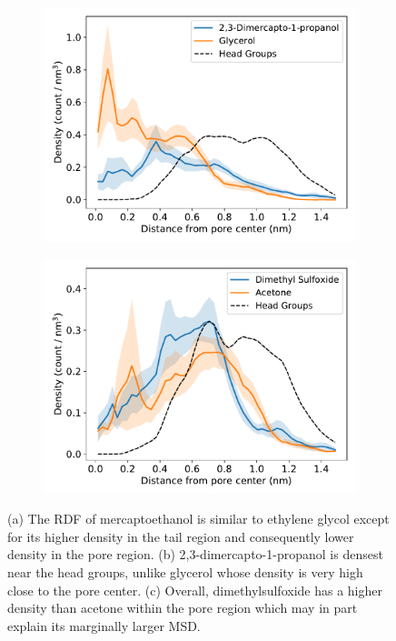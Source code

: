 \documentclass[journal=jpcbfk,manuscript=article]{achemso}
\begin{document}
\begin{figure}[!htb]
\begin{subfigure}{0.45\linewidth}
  \includegraphics[width=\textwidth]{thiol_comparison_DMP.pdf}
  \caption{}\label{fig:DMP_GLY_comparison}
  \end{subfigure}
  \begin{subfigure}{0.45\linewidth}
  \includegraphics[width=\textwidth]{thiol_comparison_DMS.pdf}
  \caption{}\label{fig:DMS_ATO_comparison}
  \end{subfigure}
  \caption{(a) The RDF of mercaptoethanol is similar to ethylene glycol except 
  for its higher density in the tail region and consequently lower density in the
  pore region. (b) 2,3-dimercapto-1-propanol is densest near the head groups, 
  unlike glycerol whose density is very high close to the pore center. 
  (c) Overall, dimethylsulfoxide has a higher density than acetone within the 
  pore region which may in part explain its marginally larger MSD.}\label{fig:sulfur_analog_rdfs}
  \end{figure}
  
\end{document}
